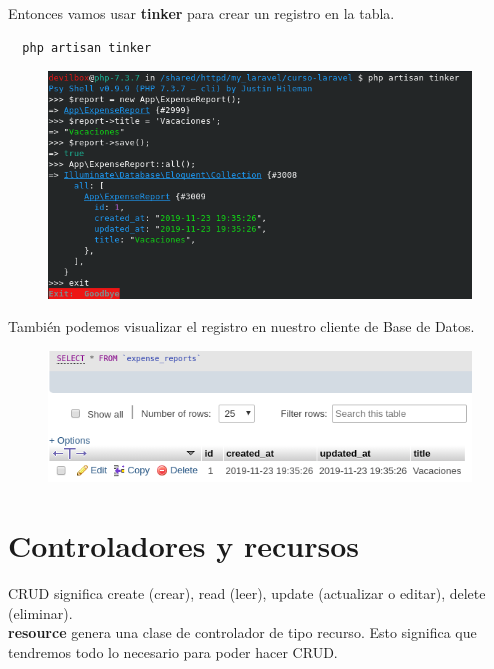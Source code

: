 \documentclass{article}
\begin{document}
Entonces vamos usar \textbf{tinker} para crear un registro en la tabla.

\begin{verbatim}
  php artisan tinker
\end{verbatim}

\begin{figure}[h!]
  \centering
  \includegraphics[scale=0.5]{./Pictures/047_new_reg_tinker.png}
\end{figure}

También podemos visualizar el registro en nuestro cliente de Base de Datos.

\begin{figure}[h!]
  \centering
  \includegraphics[scale=0.5]{./Pictures/048_expense_report.png}
\end{figure}


\section{Controladores y recursos}%
CRUD significa create (crear), read (leer), update (actualizar o editar),
delete (eliminar).\\

\textbf{resource} genera una clase de controlador de tipo recurso. Esto
significa que tendremos todo lo necesario para poder hacer CRUD.\\
\end{document}
